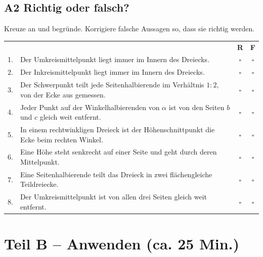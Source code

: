 \documentclass[11pt,a4paper]{article}
\begin{document}
\needspace{8cm}
\subsection{A2 \quad Richtig oder falsch?}
Kreuze an und begr\"unde. Korrigiere falsche Aussagen so, dass sie richtig werden.

\begin{tabularx}{\linewidth}{@{}r L c c@{}}
 & & \textbf{R} & \textbf{F} \\
1. & Der Umkreismittelpunkt liegt immer im Innern des Dreiecks. & $\square$ & $\square$ \\[3pt]
2. & Der Inkreismittelpunkt liegt immer im Innern des Dreiecks. & $\square$ & $\square$ \\[3pt]
3. & Der Schwerpunkt teilt jede Seitenhalbierende im Verh\"altnis $1:2$, von der Ecke aus gemessen. & $\square$ & $\square$ \\[3pt]
4. & Jeder Punkt auf der Winkelhalbierenden von $\alpha$ ist von den Seiten $b$ und $c$ gleich weit entfernt. & $\square$ & $\square$ \\[3pt]
5. & In einem rechtwinkligen Dreieck ist der H\"ohenschnittpunkt die Ecke beim rechten Winkel. & $\square$ & $\square$ \\[3pt]
6. & Eine H\"ohe steht senkrecht auf einer Seite und geht durch deren Mittelpunkt. & $\square$ & $\square$ \\[3pt]
7. & Eine Seitenhalbierende teilt das Dreieck in zwei fl\"achengleiche Teildreiecke. & $\square$ & $\square$ \\[3pt]
8. & Der Umkreismittelpunkt ist von allen drei Seiten gleich weit entfernt. & $\square$ & $\square$ \\[3pt]
\end{tabularx}

\section{Teil B -- Anwenden (ca. 25 Min.)}
\end{document}
